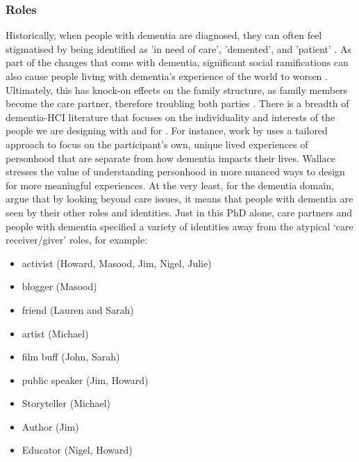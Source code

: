 \subsubsection{Roles}
\label{Roles}
Historically, when people with dementia are diagnosed, they can often feel stigmatised by being identified as ’in need of care’, ’demented’, and ’patient’ \citep{benbow_dementia_2012}. As part of the changes that come with dementia, significant social ramifications can also cause people living with dementia’s experience of the world to worsen \citep{hampson_dementia:_2016}. Ultimately, this has knock-on effects on the family structure, as family members become the care partner, therefore troubling both parties \citep{lee_technology-based_2015}. There is a breadth of dementia-HCI literature that focuses on the individuality and interests of the people we are designing with and for \citep{lazar_rethinking_2016,brankaert_intersections_2019,foley_printer_2019,mcnaney_demyouth:_2017}. For instance, work by \cite{wallace_design-led_2013} uses a tailored approach to focus on the participant's own, unique lived experiences of personhood that are separate from how dementia impacts their lives. Wallace stresses the value of understanding personhood in more nuanced ways to design for more meaningful experiences. At the very least, for the dementia domain, \cite{bartlett2010broadening} argue that by looking beyond care issues, it means that people with dementia are seen by their other roles and identities. Just in this PhD alone, care partners and people with dementia specified a variety of identities away from the atypical `care receiver/giver' roles, for example:

\begin{itemize}
\item	activist (Howard, Masood, Jim, Nigel, Julie)
\item	blogger (Masood)
\item	friend (Lauren and Sarah)
\item	artist (Michael)
\item	film buff (John, Sarah)
\item	public speaker (Jim, Howard)
\item	Storyteller (Michael)
\item	Author (Jim)
\item	Educator (Nigel, Howard)
\end{itemize}

